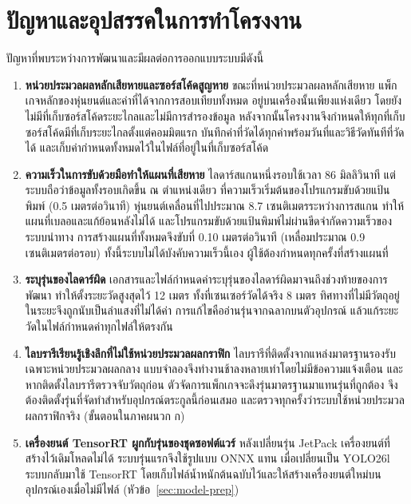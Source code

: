\documentclass[a4paper,12pt]{report}
\begin{document}
\section{ปัญหาและอุปสรรคในการทำโครงงาน}

ปัญหาที่พบระหว่างการพัฒนาและมีผลต่อการออกแบบระบบมีดังนี้

\begin{enumerate}[label=\arabic*., leftmargin=1.25cm, itemsep=6pt, topsep=6pt]
    \item \textbf{หน่วยประมวลผลหลักเสียหายและซอร์สโค้ดสูญหาย}
    ขณะที่หน่วยประมวลผลหลักเสียหาย แพ็กเกจหลักของหุ่นยนต์และค่าที่ได้จากการสอบเทียบทั้งหมด
    อยู่บนเครื่องนั้นเพียงแห่งเดียว โดยยังไม่มีที่เก็บซอร์สโค้ดระยะไกลและไม่มีการสำรองข้อมูล
    หลังจากนั้นโครงงานจึงกำหนดให้ทุกที่เก็บซอร์สโค้ดมีที่เก็บระยะไกลตั้งแต่คอมมิตแรก
    บันทึกค่าที่วัดได้ทุกค่าพร้อมวันที่และวิธีวัดทันทีที่วัดได้
    และเก็บค่ากำหนดทั้งหมดไว้ในไฟล์ที่อยู่ในที่เก็บซอร์สโค้ด

    \item \textbf{ความเร็วในการขับด้วยมือทำให้แผนที่เสียหาย}
    ไลดาร์สแกนหนึ่งรอบใช้เวลา 86 มิลลิวินาที แต่ระบบถือว่าข้อมูลทั้งรอบเกิดขึ้น ณ ตำแหน่งเดียว
    ที่ความเร็วเริ่มต้นของโปรแกรมขับด้วยแป้นพิมพ์ (0.5 เมตรต่อวินาที)
    หุ่นยนต์เคลื่อนที่ไปประมาณ 8.7 เซนติเมตรระหว่างการสแกน ทำให้แผนที่เบลอและแก้ย้อนหลังไม่ได้
    และโปรแกรมขับด้วยแป้นพิมพ์ไม่ผ่านขีดจำกัดความเร็วของระบบนำทาง
    การสร้างแผนที่ทั้งหมดจึงขับที่ 0.10 เมตรต่อวินาที (เหลื่อมประมาณ 0.9 เซนติเมตรต่อรอบ)
    ทั้งนี้ระบบไม่ได้บังคับความเร็วนี้เอง ผู้ใช้ต้องกำหนดทุกครั้งที่สร้างแผนที่

    \item \textbf{ระบุรุ่นของไลดาร์ผิด}
    เอกสารและไฟล์กำหนดค่าระบุรุ่นของไลดาร์ผิดมาจนถึงช่วงท้ายของการพัฒนา
    ทำให้ตั้งระยะวัดสูงสุดไว้ 12 เมตร ทั้งที่เซนเซอร์วัดได้จริง 8 เมตร
    ทิศทางที่ไม่มีวัตถุอยู่ในระยะจึงถูกนับเป็นลำแสงที่ไม่ได้ค่า
    การแก้ไขคืออ่านรุ่นจากฉลากบนตัวอุปกรณ์ แล้วแก้ระยะวัดในไฟล์กำหนดค่าทุกไฟล์ให้ตรงกัน

    \item \textbf{ไลบรารีเรียนรู้เชิงลึกที่ไม่ใช้หน่วยประมวลผลกราฟิก}
    ไลบรารีที่ติดตั้งจากแหล่งมาตรฐานรองรับเฉพาะหน่วยประมวลผลกลาง
    แบบจำลองจึงทำงานช้าลงหลายเท่าโดยไม่มีข้อความแจ้งเตือน
    และหากติดตั้งไลบรารีตรวจจับวัตถุก่อน ตัวจัดการแพ็กเกจจะดึงรุ่นมาตรฐานมาแทนรุ่นที่ถูกต้อง
    จึงต้องติดตั้งรุ่นที่จัดทำสำหรับอุปกรณ์ตระกูลนี้ก่อนเสมอ
    และตรวจทุกครั้งว่าระบบใช้หน่วยประมวลผลกราฟิกจริง (ขั้นตอนในภาคผนวก ก)

    \item \textbf{เครื่องยนต์ TensorRT ผูกกับรุ่นของชุดซอฟต์แวร์}
    หลังเปลี่ยนรุ่น JetPack เครื่องยนต์ที่สร้างไว้เดิมโหลดไม่ได้ ระบบรุ่นแรกจึงใช้รูปแบบ ONNX แทน
    เมื่อเปลี่ยนเป็น YOLO26l ระบบกลับมาใช้ TensorRT
    โดยเก็บไฟล์น้ำหนักต้นฉบับไว้และให้สร้างเครื่องยนต์ใหม่บนอุปกรณ์เองเมื่อไม่มีไฟล์
    (หัวข้อ~\ref{sec:model-prep})


\end{enumerate}
\end{document}
